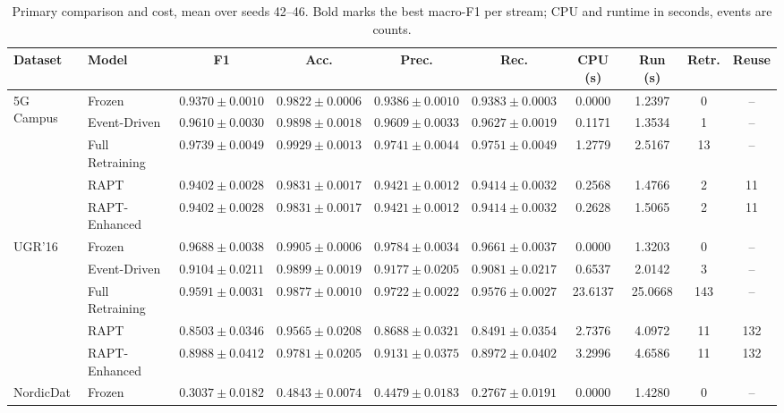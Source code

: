 \documentclass[conference]{IEEEtran}
\begin{document}
\begin{table}[t]
\caption{Primary comparison and cost, mean over seeds 42--46. Bold marks the
best macro-F1 per stream; CPU and runtime in seconds, events are counts.}
\label{tab:primary}
\centering
\scriptsize
\begin{tabular}{@{}llcccccccc@{}}
\toprule
\textbf{Dataset} & \textbf{Model} & \textbf{F1} & \textbf{Acc.} & \textbf{Prec.} & \textbf{Rec.} & \textbf{CPU (s)} & \textbf{Run (s)} & \textbf{Retr.} & \textbf{Reuse} \\
\midrule
\multirow{5}{*}{5G Campus}
 & Frozen          & $0.9370 \pm 0.0010$ & $0.9822 \pm 0.0006$ & $0.9386 \pm 0.0010$ & $0.9383 \pm 0.0003$ & 0.0000 & 1.2397 & 0 & -- \\
 & Event-Driven    & $0.9610 \pm 0.0030$ & $0.9898 \pm 0.0018$ & $0.9609 \pm 0.0033$ & $0.9627 \pm 0.0019$ & 0.1171 & 1.3534 & 1 & -- \\
 & Full Retraining & $\mathbf{0.9739 \pm 0.0049}$ & $0.9929 \pm 0.0013$ & $0.9741 \pm 0.0044$ & $0.9751 \pm 0.0049$ & 1.2779 & 2.5167 & 13 & -- \\
 & RAPT            & $0.9402 \pm 0.0028$ & $0.9831 \pm 0.0017$ & $0.9421 \pm 0.0012$ & $0.9414 \pm 0.0032$ & 0.2568 & 1.4766 & 2 & 11 \\
 & RAPT-Enhanced   & $0.9402 \pm 0.0028$ & $0.9831 \pm 0.0017$ & $0.9421 \pm 0.0012$ & $0.9414 \pm 0.0032$ & 0.2628 & 1.5065 & 2 & 11 \\
\midrule
\multirow{5}{*}{UGR'16}
 & Frozen          & $\mathbf{0.9688 \pm 0.0038}$ & $0.9905 \pm 0.0006$ & $0.9784 \pm 0.0034$ & $0.9661 \pm 0.0037$ & 0.0000 & 1.3203 & 0 & -- \\
 & Event-Driven    & $0.9104 \pm 0.0211$ & $0.9899 \pm 0.0019$ & $0.9177 \pm 0.0205$ & $0.9081 \pm 0.0217$ & 0.6537 & 2.0142 & 3 & -- \\
 & Full Retraining & $0.9591 \pm 0.0031$ & $0.9877 \pm 0.0010$ & $0.9722 \pm 0.0022$ & $0.9576 \pm 0.0027$ & 23.6137 & 25.0668 & 143 & -- \\
 & RAPT            & $0.8503 \pm 0.0346$ & $0.9565 \pm 0.0208$ & $0.8688 \pm 0.0321$ & $0.8491 \pm 0.0354$ & 2.7376 & 4.0972 & 11 & 132 \\
 & RAPT-Enhanced   & $0.8988 \pm 0.0412$ & $0.9781 \pm 0.0205$ & $0.9131 \pm 0.0375$ & $0.8972 \pm 0.0402$ & 3.2996 & 4.6586 & 11 & 132 \\
\midrule
\multirow{5}{*}{NordicDat}
 & Frozen          & $0.3037 \pm 0.0182$ & $0.4843 \pm 0.0074$ & $0.4479 \pm 0.0183$ & $0.2767 \pm 0.0191$ & 0.0000 & 1.4280 & 0 & -- \\

\end{tabular}
\end{table}
\end{document}
